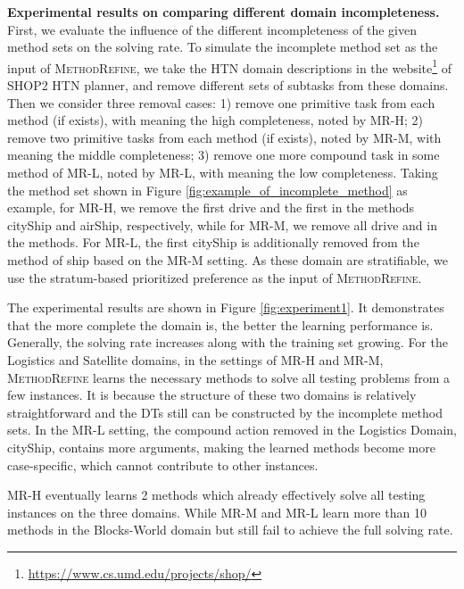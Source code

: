\documentclass[letterpaper]{article} %
\begin{document}
\textbf{Experimental results on comparing different domain incompleteness.}
First, we evaluate the influence of the different incompleteness of the given method sets on the solving rate.
To simulate the incomplete method set as the input of \textsc{MethodRefine}, we take the HTN domain descriptions in the website\footnote{\url{https://www.cs.umd.edu/projects/shop/}} of SHOP2 HTN planner, and remove different sets of subtasks from these domains. Then we consider three removal cases: 1) remove one primitive task from each method (if exists), with meaning the high completeness, noted by MR-H; 2) remove two primitive tasks from each method (if exists), noted by MR-M, with meaning the middle completeness; 3) remove one more compound task in some method of MR-L, noted by MR-L, with meaning the low completeness.
Taking the method set shown in Figure \ref{fig:example_of_incomplete_method} as example,
for MR-H, we remove the first \textsf{drive} and the first  in the methods \textsf{cityShip} and \textsf{airShip}, respectively,
while for MR-M, we remove all \textsf{drive} and  in the methods.
For MR-L, the first \textsf{cityShip} is additionally removed from the method of \textsf{ship} based on the MR-M setting.
As these domain are stratifiable, we use the stratum-based prioritized preference as the input of \textsc{MethodRefine}.

The experimental results are shown in Figure \ref{fig:experiment1}.
It demonstrates that the more complete the domain is, the better the learning performance is.
Generally, the solving rate increases along with the training set growing. %
For the Logistics and Satellite domains, in the settings of MR-H and MR-M, \textsc{MethodRefine} learns the necessary methods to solve all testing problems from a few instances.
It is because the structure of these two domains is relatively straightforward and the DTs still can be constructed by the incomplete method sets.
In the MR-L setting, the compound action removed in the Logistics Domain, \textsf{cityShip}, contains more arguments, making the learned methods become more case-specific, which cannot contribute to other instances.

MR-H eventually learns 2 methods which already effectively solve all testing instances on the three domains.
While MR-M and MR-L learn more than 10 methods in the Blocks-World domain but still fail to achieve the full solving rate.
\end{document}
